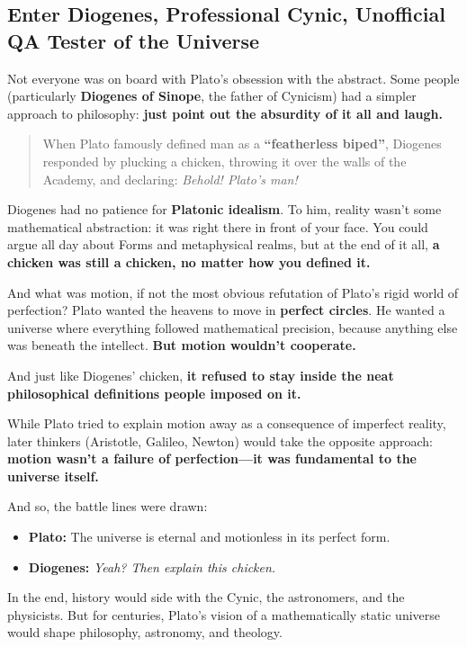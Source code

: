 \subsection{Enter Diogenes, Professional Cynic, Unofficial QA Tester of the Universe}

Not everyone was on board with Plato’s obsession with the abstract. Some people (particularly \textbf{Diogenes of Sinope}, the father of Cynicism) had a simpler approach to philosophy: \textbf{just point out the absurdity of it all and laugh.} 

\begin{quote}
When Plato famously defined man as a \textbf{``featherless biped''}, Diogenes responded by plucking a chicken, throwing it over the walls of the Academy, and declaring: \textit{Behold! Plato’s man!}
\end{quote}

Diogenes had no patience for \textbf{Platonic idealism}. To him, reality wasn’t some mathematical abstraction: it was right there in front of your face. You could argue all day about Forms and metaphysical realms, but at the end of it all, \textbf{a chicken was still a chicken, no matter how you defined it.}

And what was motion, if not the most obvious refutation of Plato’s rigid world of perfection?  Plato wanted the heavens to move in \textbf{perfect circles}. He wanted a universe where everything followed mathematical precision, because anything else was beneath the intellect. \textbf{But motion wouldn’t cooperate.}

And just like Diogenes’ chicken, \textbf{it refused to stay inside the neat philosophical definitions people imposed on it.}

While Plato tried to explain motion away as a consequence of imperfect reality, later thinkers (Aristotle, Galileo, Newton) would take the opposite approach: \textbf{motion wasn’t a failure of perfection—it was fundamental to the universe itself.} 

And so, the battle lines were drawn:

\begin{itemize}
    \item \textbf{Plato:} The universe is eternal and motionless in its perfect form.  
    \item \textbf{Diogenes:} \textit{Yeah? Then explain this chicken.}  
\end{itemize}

In the end, history would side with the Cynic, the astronomers, and the physicists. But for centuries, Plato’s vision of a mathematically static universe would shape philosophy, astronomy, and theology.

